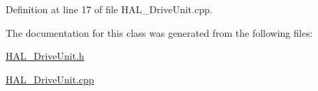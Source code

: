 Definition at line 17 of file H\+A\+L\+\_\+\+Drive\+Unit.\+cpp.



The documentation for this class was generated from the following files\+:\begin{DoxyCompactItemize}
\item 
\mbox{\hyperlink{_h_a_l___drive_unit_8h}{H\+A\+L\+\_\+\+Drive\+Unit.\+h}}\item 
\mbox{\hyperlink{_h_a_l___drive_unit_8cpp}{H\+A\+L\+\_\+\+Drive\+Unit.\+cpp}}\end{DoxyCompactItemize}
